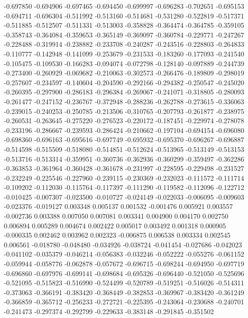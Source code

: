 -0.697850
-0.694906
-0.697465
-0.694450
-0.699997
-0.696283
-0.702651
-0.695153
-0.694711
-0.696304
-0.511992
-0.513160
-0.514681
-0.531280
-0.522819
-0.517371
-0.511885
-0.512507
-0.511331
-0.513003
-0.358828
-0.364474
-0.364785
-0.359105
-0.358743
-0.364084
-0.359653
-0.365149
-0.369097
-0.360784
-0.229771
-0.247267
-0.228488
-0.319914
-0.238882
-0.233708
-0.240287
-0.243516
-0.228803
-0.264833
-0.110777
-0.142948
-0.141099
-0.253679
-0.231533
-0.183260
-0.177093
-0.241540
-0.105475
-0.109530
-0.166283
-0.094074
-0.072798
-0.128140
-0.097889
-0.244739
-0.273400
-0.260929
-0.069682
-0.210063
-0.302573
-0.266476
-0.189809
-0.298019
-0.257607
-0.234597
-0.140604
-0.204590
-0.292166
-0.294382
-0.250547
-0.245020
-0.260395
-0.297900
-0.286183
-0.296384
-0.269067
-0.241071
-0.318805
-0.280093
-0.261477
-0.247152
-0.236767
-0.372948
-0.288236
-0.262788
-0.273615
-0.336063
-0.239015
-0.240253
-0.250785
-0.213506
-0.310765
-0.207793
-0.261877
-0.238975
-0.260531
-0.263645
-0.275220
-0.276523
-0.220172
-0.187451
-0.229974
-0.278078
-0.233196
-0.286667
-0.239593
-0.286424
-0.210662
-0.197104
-0.694154
-0.696080
-0.698360
-0.696163
-0.695616
-0.697749
-0.695932
-0.695370
-0.696267
-0.696887
-0.514598
-0.515509
-0.518080
-0.514851
-0.512624
-0.513965
-0.513149
-0.513153
-0.513716
-0.513314
-0.359951
-0.360736
-0.362936
-0.360299
-0.359497
-0.362286
-0.363853
-0.361964
-0.360428
-0.361678
-0.231997
-0.228595
-0.229498
-0.231527
-0.232249
-0.225546
-0.227960
-0.239115
-0.230369
-0.232023
-0.111572
-0.111714
-0.109202
-0.112030
-0.115764
-0.117397
-0.111290
-0.119582
-0.112096
-0.122712
-0.010425
-0.007307
-0.023500
-0.010727
-0.024149
-0.022033
-0.006095
-0.009603
-0.023376
-0.019127
0.003348
0.005137
0.001532
-0.001476
0.005921
0.003557
-0.002736
0.003388
0.007050
0.007081
0.003341
0.004900
0.004170
0.002750
0.006894
0.005289
0.004674
0.002422
0.005017
0.003492
0.001318
0.000905
-0.000335
0.002462
0.003962
0.002323
-0.006875
0.006538
0.003334
0.002545
0.006561
-0.018780
-0.048480
-0.034926
-0.038724
-0.041454
-0.027686
-0.042023
-0.041102
-0.035379
-0.046214
-0.056383
-0.032246
-0.052222
-0.055276
-0.061152
-0.059944
-0.058776
-0.062878
-0.057672
-0.696715
-0.698244
-0.694950
-0.697719
-0.696860
-0.697976
-0.699141
-0.698684
-0.695326
-0.696440
-0.521050
-0.525696
-0.521095
-0.515823
-0.516990
-0.524499
-0.520789
-0.519251
-0.516026
-0.514311
-0.373063
-0.366191
-0.383420
-0.368449
-0.382853
-0.369967
-0.383420
-0.361249
-0.366859
-0.365712
-0.256233
-0.272721
-0.225395
-0.243064
-0.230688
-0.240701
-0.241473
-0.297374
-0.292799
-0.229633
-0.383148
-0.291845
-0.351502
